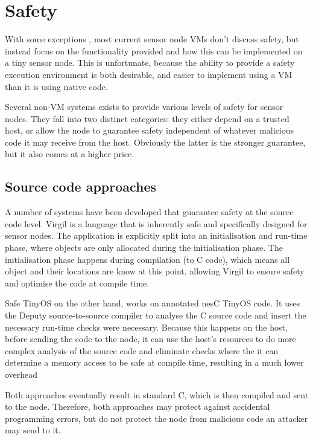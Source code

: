 \section{Safety}
\label{sec-state-of-the-art-safety}
With some exceptions \cite{Evers:2010ur}, most current sensor node VMs don't discuss safety, but instead focus on the functionality provided and how this can be implemented on a tiny sensor node. This is unfortunate, because the ability to provide a safety execution environment is both desirable, and easier to implement using a VM than it is using native code.

Several non-VM systems exists to provide various levels of safety for sensor nodes. They fall into two distinct categories: they either depend on a trusted host, or allow the node to guarantee safety independent of whatever malicious code it may receive from the host. Obviously the latter is the stronger guarantee, but it also comes at a higher price.

\subsection{Source code approaches}
A number of systems have been developed that guarantee safety at the source code level. Virgil \cite{Titzer:2006uy} is a language that is inherently safe and specifically designed for sensor nodes. The application is explicitly split into an initialisation and run-time phase, where objects are only allocated during the initialisation phase. The initialisation phase happens during compilation (to C code), which means all object and their locations are know at this point, allowing Virgil to ensure safety and optimise the code at compile time.

Safe TinyOS on the other hand, works on annotated nesC TinyOS code. It uses the Deputy \cite{Condit:2007uo} source-to-source compiler to analyse the C source code and insert the necessary run-time checks were necessary. Because this happens on the host, before sending the code to the node, it can use the host's resources to do more complex analysis of the source code and eliminate checks where the it can determine a memory access to be safe at compile time, resulting in a much lower overhead

Both approaches eventually result in standard C, which is then compiled and sent to the node. Therefore, both approaches may protect against accidental programming errors, but do not protect the node from malicious code an attacker may send to it.

